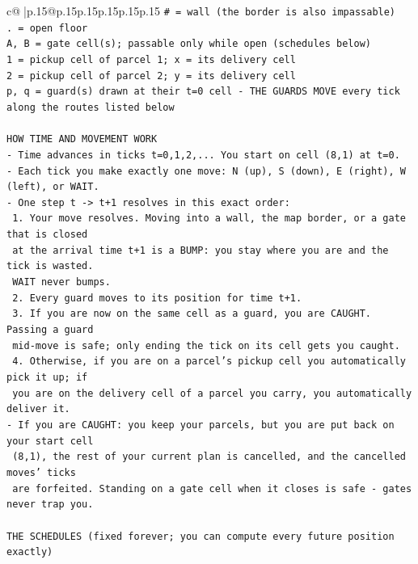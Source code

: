 \documentclass{article}
\begin{document}
{\begin{supertabular}{c@{$\;$}|p{.15\linewidth}@{}p{.15\linewidth}p{.15\linewidth}p{.15\linewidth}p{.15\linewidth}p{.15\linewidth}}
{{{\texttt{\# = wall (the border is also impassable)} \\
\texttt{. = open floor} \\
\texttt{A, B = gate cell(s); passable only while open (schedules below)} \\
\texttt{1 = pickup cell of parcel 1; x = its delivery cell} \\
\texttt{2 = pickup cell of parcel 2; y = its delivery cell} \\
\texttt{p, q = guard(s) drawn at their t=0 cell {-} THE GUARDS MOVE every tick along the routes listed below} \\
\\ 
\texttt{HOW TIME AND MOVEMENT WORK} \\
\texttt{{-} Time advances in ticks t=0,1,2,... You start on cell (8,1) at t=0.} \\
\texttt{{-} Each tick you make exactly one move: N (up), S (down), E (right), W (left), or WAIT.} \\
\texttt{{-} One step t {-}> t+1 resolves in this exact order:} \\
\texttt{  1. Your move resolves. Moving into a wall, the map border, or a gate that is closed} \\
\texttt{     at the arrival time t+1 is a BUMP: you stay where you are and the tick is wasted.} \\
\texttt{     WAIT never bumps.} \\
\texttt{  2. Every guard moves to its position for time t+1.} \\
\texttt{  3. If you are now on the same cell as a guard, you are CAUGHT. Passing a guard} \\
\texttt{     mid{-}move is safe; only ending the tick on its cell gets you caught.} \\
\texttt{  4. Otherwise, if you are on a parcel's pickup cell you automatically pick it up; if} \\
\texttt{     you are on the delivery cell of a parcel you carry, you automatically deliver it.} \\
\texttt{{-} If you are CAUGHT: you keep your parcels, but you are put back on your start cell} \\
\texttt{  (8,1), the rest of your current plan is cancelled, and the cancelled moves' ticks} \\
\texttt{  are forfeited. Standing on a gate cell when it closes is safe {-} gates never trap you.} \\
\\ 
\texttt{THE SCHEDULES (fixed forever; you can compute every future position exactly)} \\
}}}
\end{supertabular}}
\end{document}
